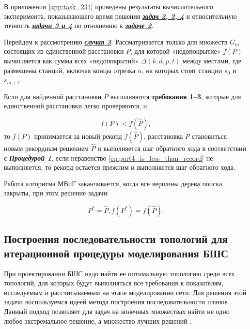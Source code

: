 В приложении  \cref{app:task_234} приведены результаты вычислительного эксперимента, показывающего время решения \underline{\textit{\textbf{задач 2, 3, 4}}} и относительную точность \underline{\textit{\textbf{задачи 3 и 4}}} по отношению к \underline{\textit{\textbf{задаче 2}}}.

Перейдем к рассмотрению \underline{\textit{\textbf{случая 3}}}. Рассматривается только для множеств $G_\nu$, состоящих из единственной расстановки $P$, для которой «недопокрытие» $f(P)$ вычисляется как сумма всех «недопокрытий» $\Delta(k,d,p,t)$ между местами, где размещены станций, включая концы отрезка $\alpha$, на которых стоят станции $s_0$ и $s_{m+1}$. 

Если для найденной расстановки $P$ выполняются \textbf{требования 1--3}, которые для единственной расстановки легко проверяются, и

\begin{equation}
    \label{eq:part4_is_less_than_record}
    f(P) < f(\widehat{P}),
\end{equation}
то $f(P)$ принимается за новый рекорд $f(\widehat{P})$, расстановка $P$ становиться новым рекордным решением $\widehat{P}$ и выполняется шаг обратного хода в соответствии с \textit{\textbf{Процедурой 1}}, если неравенство \cref{eq:part4_is_less_than_record} не выполняется, то рекорд остается прежним и выполняется шаг обратного хода.

Работа алгоритма МВиГ заканчивается, когда все вершины дерева поиска закрыты, при этом решение задачи: 

\begin{displaymath}
    P^{*} = \widehat{P},  f(P^*) = f(\widehat{P}).
\end{displaymath}

\subsection{Построения последовательности топологий для итерационной процедуры моделирования БШС}

При проектировании БШС надо найти ее оптимальную топологию среди всех топологий, для которых будут выполняться все требования к показателям, исследуемым и рассчитываемым на этапе моделировании сети. Для решения этой задачи воспользуемся идеей метода построения последовательности планов \cite{Emelichev}. Данный подход позволяет для задач на конечных множествах найти не одно любое экстремальное решение, а множество лучших решений \cite{Pershin1999, Pershin2002}.

